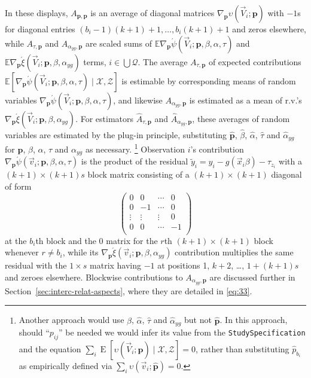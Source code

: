 \documentclass{article}
\newcommand{\EE}{\operatorname{E}}
\newcommand{\absorbInterceptsEF}{\upsilon}
\begin{document}
In these displays, $A_{\mathbf{p}, \mathbf{p}}$ is
an average of diagonal matrices $\nabla_{\mathbf{p}}\absorbInterceptsEF(\vec{V}_{i};
\mathbf{p})$ with $-1$s for diagonal entries $(b_{i}-1)(k+1)+1, \ldots,
b_{i}(k+1) +1$ and zeros elsewhere, while $A_{\tau,
  \mathbf{p}}$ and $A_{\alpha_{yg},
  \mathbf{p}}$ are scaled sums of $\mathbb{E} \nabla_{\mathbf{p}}\acute{\psi}(\vec{V}_{i};
\mathbf{p}, \beta, \alpha, \tau)$ and $\mathbb{E} \nabla_{\mathbf{p}}\acute{\xi}(\vec{V}_{i};
\mathbf{p}, \beta, \alpha_{yg})$ terms, $i \in \bigcup \mathcal{Q}$. The average $A_{\tau,
  \mathbf{p}}$ of expected contributions $\mathbb{E}[ \nabla_{\mathbf{p}}\acute{\psi}(\vec{V}_{i};
\mathbf{p}, \beta, \alpha, \tau) \mid \mathcal{X}, \mathcal{Z}]$ is estimable by corresponding means of
random variables $\nabla_{\mathbf{p}}\acute{\psi}(\vec{V}_{i};
\mathbf{p}, \beta,  \alpha, \tau)$, and likewise $A_{\alpha_{yg},
  \mathbf{p}}$ is estimated as a mean of r.v.'s
$\nabla_{\mathbf{p}}\acute{\xi}(\vec{V}_{i}; \mathbf{p}, \beta,  \alpha_{yg})$. For estimators
$\hat{A}_{\tau, \mathbf{p}}$ and $\hat{A}_{\alpha_{yg},
  \mathbf{p}}$, these averages of random variables are
estimated by the plug-in principle, substituting $\hat{\mathbf{p}}$,
$\hat\beta$, $\hat{\alpha}$, $\hat{\tau}$ and $\hat{\alpha}_{yg}$
for $\mathbf{p}$, $\beta$, $\alpha$, 
$\tau$ and $\alpha_{yg}$ as necessary.%
\footnote{%
Another approach would use $\hat\beta$, $\hat{\alpha}$,
$\hat{\tau}$ and $\hat{\alpha}_{yg}$ but not $\hat{\mathbf{p}}$.  In this approach, should 
``${p}_{ij}$'' be needed we would infer its value from the
\texttt{StudySpecification} and the equation $\sum_{i} \EE [\absorbInterceptsEF(\vec{V}_{i};
\mathbf{p}) \mid \mathcal{X}, \mathcal{Z}]=0$, rather than substituting
$\hat{p}_{b_{i}}$ as empirically defined via $\sum_{i} \absorbInterceptsEF(\vec{v}_{i};
\hat{\mathbf{p}})=0$.}
Observation $i$'s contribution $\nabla_{\mathbf{p}}\acute{\psi}(\vec{v}_{i};
\mathbf{p}, \beta, \alpha, \tau)$ is the product of the residual $\tilde{y}_{i}=y_{i} - g(\vec{x}_{i}\beta) -
\tau_{z_{i}}$ with a $(k+1) \times (k+1)s$ block matrix
consisting of a $(k+1)\times (k+1)$ diagonal of form
\begin{equation*}
  \begin{pmatrix}
    0& 0& \cdots & 0\\
    0&-1& \cdots&0\\
    \vdots&\vdots&\vdots& 0\\
    0&0&\cdots&-1\\
  \end{pmatrix}
\end{equation*}
at the
$b_{i}$th block and the 0 matrix for the $r$th $(k+1) \times (k+1)$ block whenever
$r\neq b_{i}$, while its $\nabla_{\mathbf{p}}\acute{\xi}(\vec{v}_{i};
\mathbf{p}, \beta, \alpha_{yg})$ contribution multiplies the same
residual with the $1 \times s$ matrix having $-1$ at positions 1,
$k+2$, \ldots, $1+(k+1)s$ and zeroes elsewhere. Blockwise
contributions to $A_{\alpha_{yg},  \mathbf{p}}$ are discussed further
in Section~\ref{sec:interc-relat-aspects}, where they are detailed in \eqref{eq:33}.
\end{document}
